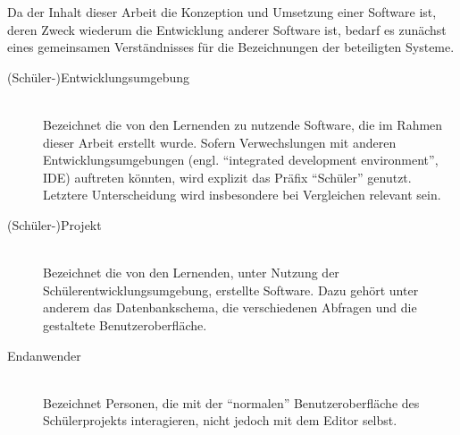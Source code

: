 Da der Inhalt dieser Arbeit die Konzeption und Umsetzung einer Software ist, deren Zweck wiederum die Entwicklung anderer Software ist, bedarf es zunächst eines gemeinsamen Verständnisses für die Bezeichnungen der beteiligten Systeme.

\begin{description}
\item[(Schüler-)Entwicklungsumgebung] \hfill\\ 
  Bezeichnet die von den Lernenden zu nutzende Software, die im Rahmen dieser Arbeit erstellt wurde. Sofern Verwechslungen mit anderen Entwicklungsumgebungen (engl. ``integrated development environment'', IDE) auftreten könnten, wird explizit das Präfix ``Schüler'' genutzt. Letztere Unterscheidung wird insbesondere bei Vergleichen relevant sein.
\item[(Schüler-)Projekt] \hfill\\
  Bezeichnet die von den Lernenden, unter Nutzung der Schülerentwicklungsumgebung, erstellte Software. Dazu gehört unter anderem das Datenbankschema, die verschiedenen Abfragen und die gestaltete Benutzeroberfläche.
\item[Endanwender] \hfill\\
  Bezeichnet Personen, die mit der ``normalen'' Benutzeroberfläche des Schülerprojekts interagieren, nicht jedoch mit dem Editor selbst.
\end{description}
